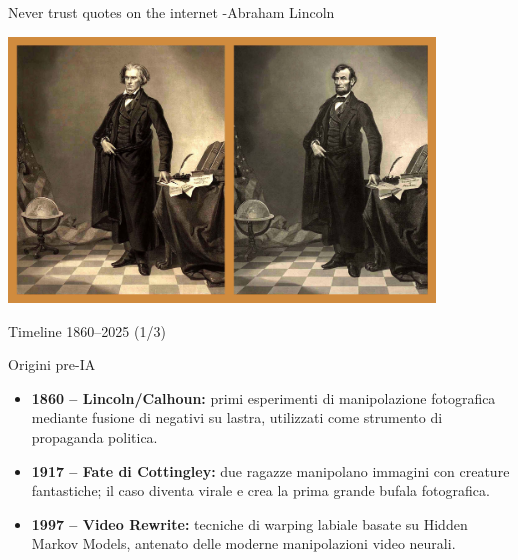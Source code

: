 \documentclass[12pt]{beamer}
\begin{document}
\begin{frame}{Never trust quotes on the internet -Abraham Lincoln}
  \begin{center}
    \includegraphics[width=0.85\textwidth]{Pic/Licon_deepfake.jpg}
  \end{center}
\end{frame}



\begin{frame}{Timeline 1860–2025 (1/3)}
  \begin{alertblock}{Origini pre-IA}
    \begin{itemize}
      \item \textbf{1860 – Lincoln/Calhoun:} primi esperimenti di manipolazione fotografica mediante fusione di negativi su lastra, utilizzati come strumento di propaganda politica.
      \item \textbf{1917 – Fate di Cottingley:} due ragazze manipolano immagini con creature fantastiche; il caso diventa virale e crea la prima grande bufala fotografica.
      \item \textbf{1997 – Video Rewrite:} tecniche di warping labiale basate su Hidden Markov Models, antenato delle moderne manipolazioni video neurali.\cite{video_rewrite}
    \end{itemize}
  \end{alertblock}
\end{frame}
\end{document}
